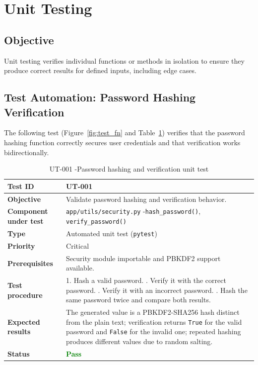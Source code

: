 \section{Unit Testing}

\subsection{Objective}

Unit testing verifies individual functions or methods in isolation to ensure they produce correct results for defined inputs, including edge cases.


\subsection{Test Automation: Password Hashing Verification}

The following test (Figure~\ref{fig:test_fn} and Table~\ref{tab:ut001}) verifies that the password hashing function correctly secures user credentials and that verification works bidirectionally.
\begin{table}[H]
\caption{UT-001 -Password hashing and verification unit test}
\centering
\begin{tabular}{|l|p{13cm}|}
\hline
\textbf{Test ID} & UT-001 \\
\hline
\textbf{Objective} & Validate password hashing and verification behavior. \\
\hline
\textbf{Component under test} & \texttt{app/utils/security.py} -\texttt{hash\_password()}, \texttt{verify\_password()} \\
\hline
\textbf{Type} & Automated unit test (\texttt{pytest}) \\
\hline
\textbf{Priority} & Critical \\
\hline
\textbf{Prerequisites} & Security module importable and PBKDF2 support available. \\
\hline
\textbf{Test procedure} &
1. Hash a valid password. \newline
2. Verify it with the correct password. \newline
3. Verify it with an incorrect password. \newline
4. Hash the same password twice and compare both results. \\
\hline
\textbf{Expected results} &
The generated value is a PBKDF2-SHA256 hash distinct from the plain text; verification returns \texttt{True} for the valid password and \texttt{False} for the invalid one; repeated hashing produces different values due to random salting. \\
\hline
\textbf{Status} & \textcolor{green}{\textbf{Pass}} \\
\hline
\end{tabular}

\label{tab:ut001}
\end{table}

